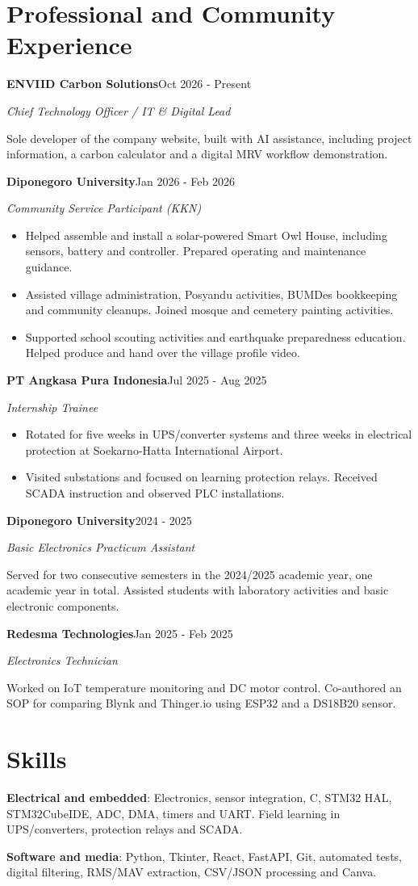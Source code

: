 \documentclass[11pt,a4paper]{article}
\newcommand{\cventry}[6]{%
  \Needspace{4\baselineskip}%
  \textbf{#3}\hfill #1\par
  \textit{#2}\ifstrempty{#4}{}{\hfill #4}\par
  #6\par\vspace{4pt}}
\newcommand{\cvitem}[2]{\textbf{#1}: #2\par}
\begin{document}
\section{Professional and Community Experience}
\cventry{Oct 2026 - Present}{Chief Technology Officer / IT \& Digital Lead}{ENVIID Carbon Solutions}{}{}{
Sole developer of the company website, built with AI assistance, including project information,
a carbon calculator and a digital MRV workflow demonstration.}
\cventry{Jan 2026 - Feb 2026}{Community Service Participant (KKN)}{Diponegoro University}{Mutihan, Klaten}{}{
\begin{itemize}
\item Helped assemble and install a solar-powered Smart Owl House, including sensors, battery and controller. Prepared operating and maintenance guidance.
\item Assisted village administration, Posyandu activities, BUMDes bookkeeping and community cleanups. Joined mosque and cemetery painting activities.
\item Supported school scouting activities and earthquake preparedness education. Helped produce and hand over the village profile video.
\end{itemize}}
\cventry{Jul 2025 - Aug 2025}{Internship Trainee}{PT Angkasa Pura Indonesia}{}{}{
\begin{itemize}
\item Rotated for five weeks in UPS/converter systems and three weeks in electrical protection at Soekarno-Hatta International Airport.
\item Visited substations and focused on learning protection relays. Received SCADA instruction and observed PLC installations.
\end{itemize}}
\cventry{2024 - 2025}{Basic Electronics Practicum Assistant}{Diponegoro University}{}{}{
Served for two consecutive semesters in the 2024/2025 academic year, one academic year in total.
Assisted students with laboratory activities and basic electronic components.}
\cventry{Jan 2025 - Feb 2025}{Electronics Technician}{Redesma Technologies}{}{}{
Worked on IoT temperature monitoring and DC motor control. Co-authored an SOP
for comparing Blynk and Thinger.io using ESP32 and a DS18B20 sensor.}

\section{Skills}
\cvitem{Electrical and embedded}{Electronics, sensor integration, C, STM32 HAL,
STM32CubeIDE, ADC, DMA, timers and UART. Field learning in UPS/converters, protection relays and SCADA.}
\cvitem{Software and media}{Python, Tkinter, React, FastAPI, Git, automated tests,
digital filtering, RMS/MAV extraction, CSV/JSON processing and Canva.}
\end{document}
